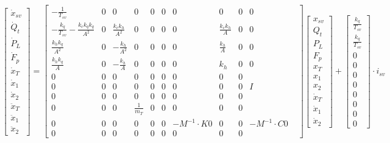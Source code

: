 \begin{align}
\begin{bmatrix} 
    \dot{x}_{sv} \\[6pt]
    \dot{Q}_t \\[6pt]
    \dot{P}_L \\[6pt]
    \dot{F}_p \\[6pt]
    \dot{x}_T \\[6pt]
    \dot{x}_1 \\[6pt]
    \dot{x}_2 \\[6pt]
    \ddot{x}_T \\[6pt]
    \ddot{x}_1 \\[6pt]
    \ddot{x}_2 
\end{bmatrix} =
\begin{bmatrix}
    -\frac{1}{T_{sv}} & 0 & 0 & 0 & 0 & 0 & 0 & 0 & 0 & 0\\[6pt]
    -\frac{k_q}{T_{sv}} - \frac{k_c k_q k_q}{A^2} & 0 & \frac{k_c k_h}{A^2} & 0 & 0 & 0 & 0 & \frac{k_c k_h}{A} & 0 & 0 \\[6pt]
    \frac{k_h k_q}{A^2} & 0 & -\frac{k_h}{A^2} & 0 & 0 & 0 & 0 & \frac{ k_h}{A} & 0 & 0 \\[6pt]
    \frac{k_h k_q}{A} & 0 & -\frac{k_h}{A} & 0 & 0 & 0 & 0 & k_h & 0 & 0 \\[6pt]
  0 &  0 & 0 & 0              & 0 & 0 & 0 & 0 & 0 &   \\[6pt]
  0 &  0 & 0 & 0              & 0 & 0 & 0 & 0 & 0 & I &   \\[6pt]
  0 &  0 & 0 & 0              & 0 & 0 & 0 & 0 & 0 &   \\[6pt]
  0 &  0 & 0 & \frac{1}{m_T}  & 0 & 0 & 0 & 0 & 0 &   \\[6pt]
  0 &  0 & 0 &              0 & 0 & 0 & -M^{-1}\cdot K  0 & 0 & 0 & -M^{-1}\cdot C  0 &   \\[6pt]
  0 &  0 & 0 &              0 & 0 & 0 & 0 & 0 & 0 &   
\end{bmatrix}
\begin{bmatrix}
    x_{sv} \\[6pt]
    Q_t \\[6pt]
    P_L \\[6pt]
    F_p \\[6pt]
    x_T \\[6pt]
    x_1 \\[6pt]
    x_2 \\[6pt]
    \dot{x}_T \\[6pt]
    \dot{x}_1 \\[6pt]
    \dot{x}_2
\end{bmatrix} +
\begin{bmatrix}
    \frac{k_q}{T_{sv}}  \\[6pt]
    \frac{k_q}{T_{sv}}  \\[6pt]
    0 \\[6pt]
    0 \\[6pt]
    0 \\[6pt]
    0 \\[6pt]
    0 \\[6pt]
    0 \\[6pt]
    0 \\[6pt]
    0
\end{bmatrix}
\cdot i_{sv}
\end{align}

